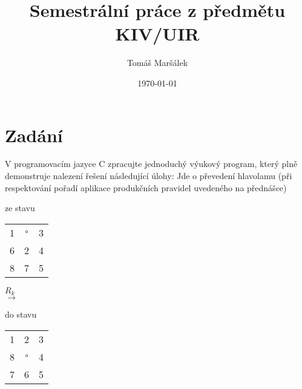\documentclass[11pt]{article}
\author{Tomáš Maršálek}
\title{Semestrální práce z předmětu KIV/UIR}
\date{\today}
\begin{document}
\begin{titlepage}
\maketitle
\end{titlepage}

\section{Zadání}
V programovacím jazyce C zpracujte jednoduchý výukový program, který plně
demonstruje nalezení řešení následující úlohy: Jde o převedení hlavolamu 
(při respektování pořadí aplikace produkčních pravidel uvedeného na přednášce)

\vspace{.3cm}

\begin{center}
\begin{minipage}[b]{.3\textwidth}
\centering
ze stavu \\
\vspace{.1cm}
\begin{LARGE}
\begin{tabular}{|ccc|}
\hline
1 &  $\square$ & 3 \\
6 & 2 & 4 \\
8 & 7 & 5 \\
\hline
\end{tabular}
\end{LARGE}
\end{minipage}
\begin{minipage}[b]{.2\textwidth}
{\large $R_k$} \\
$\longrightarrow$
\end{minipage}
\begin{minipage}[b]{.3\textwidth}
\centering
do stavu \\
\vspace{.1cm}
\begin{LARGE}
\begin{tabular}{|ccc|}
\hline
1 & 2 & 3 \\
8 & $\square$ & 4 \\
7 & 6 & 5 \\
\hline
\end{tabular}
\end{LARGE}
\end{minipage}
\end{center}

\vspace{.3cm}
\end{document}
